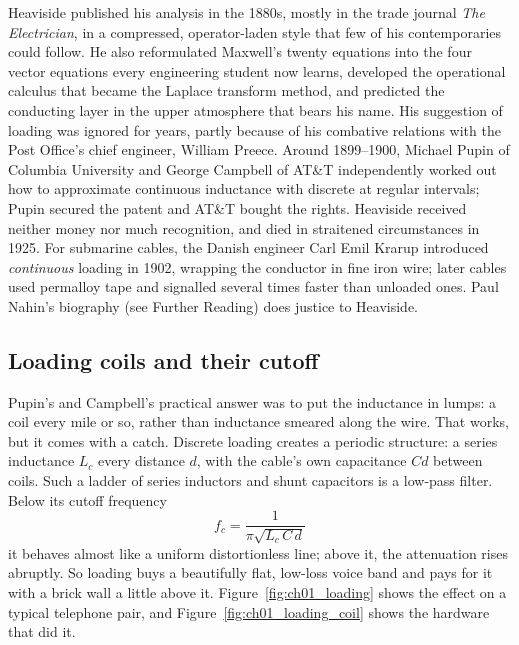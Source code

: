 \begin{history}
Heaviside published his analysis in the 1880s, mostly in the trade journal \emph{The Electrician},
in a compressed, operator-laden style that few of his contemporaries could follow. He also
reformulated Maxwell's twenty equations into the four vector equations every engineering student
now learns, developed the operational calculus that became the Laplace transform method, and
predicted the conducting layer in the upper atmosphere that bears his name. His suggestion of
loading was ignored for years, partly because of his combative relations with the Post Office's
chief engineer, William Preece. Around 1899--1900, Michael Pupin of Columbia University and George
Campbell of AT\&T independently worked out how to approximate continuous inductance with discrete
 at regular intervals; Pupin secured the patent and AT\&T bought the rights.
Heaviside received neither money nor much recognition, and died in straitened circumstances in 1925.
For submarine cables, the Danish engineer Carl Emil Krarup introduced \emph{continuous} loading in
1902, wrapping the conductor in fine iron wire; later cables used permalloy tape and signalled
several times faster than unloaded ones. Paul Nahin's biography (see Further Reading) does justice
to Heaviside.
\end{history}


\subsection{Loading coils and their cutoff}

Pupin's and Campbell's practical answer was to put the inductance in lumps: a coil every mile or so,
rather than inductance smeared along the wire. That works, but it comes with a catch. Discrete loading
creates a periodic structure: a series inductance $L_c$ every distance $d$, with the cable's own
capacitance $Cd$ between coils. Such a ladder of series inductors and shunt capacitors is a low-pass
filter. Below its cutoff frequency
\begin{equation}
f_c = \frac{1}{\pi\sqrt{L_c\,C\,d}}
\label{eq:ch01:loadcut}
\end{equation}
it behaves almost like a uniform distortionless line; above it, the attenuation rises abruptly. So
loading buys a beautifully flat, low-loss voice band and pays for it with a brick wall a little above
it. Figure~\ref{fig:ch01_loading} shows the effect on a typical telephone pair, and
Figure~\ref{fig:ch01_loading_coil} shows the hardware that did it.


